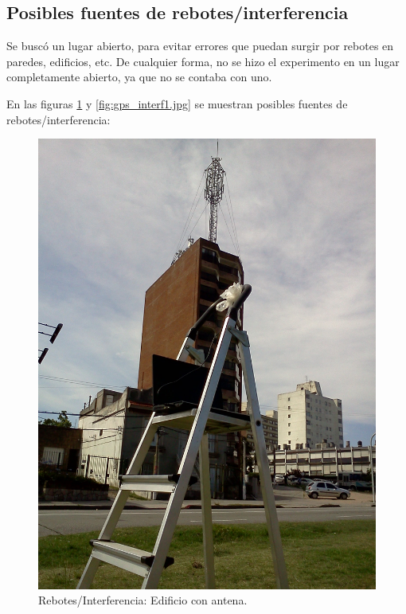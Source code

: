 \documentclass[spanish,12pt,a4paper,titlepage]{report}
\begin{document}
\newpage

\subsection{Posibles fuentes de rebotes/interferencia}
\label{sec:posibles-fuentes-de-rebotes-interferencia}

Se buscó un lugar abierto, para evitar errores que puedan surgir por rebotes en paredes, edificios, etc. De cualquier forma, no se hizo el experimento en un lugar completamente abierto, ya que no se contaba con uno.

En las figuras \ref{fig:gps_interf.jpg} y \ref{fig:gps_interf1.jpg} se muestran posibles fuentes de rebotes/interferencia:

\begin{figure}[h!]
  \begin{center}
  \includegraphics[width=.9\textwidth]{./img/gps_interf.jpg}
  \end{center}
  \caption{Rebotes/Interferencia: Edificio con antena.}
  \label{fig:gps_interf.jpg}
\end{figure}
\end{document}
